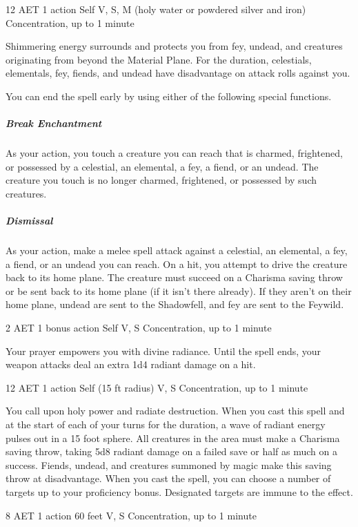 {12 AET}
{1 action}
{Self}
{V, S, M (holy water or powdered silver and iron)}
{Concentration, up to 1 minute}

Shimmering energy surrounds and protects you from fey, undead, and creatures originating from beyond the Material Plane. For the duration, celestials, elementals, fey, fiends, and undead have disadvantage on attack rolls against you.

You can end the spell early by using either of the following special functions.

\subparagraph*{Break Enchantment} As your action, you touch a creature you can reach that is charmed, frightened, or possessed by a celestial, an elemental, a fey, a fiend, or an undead. The creature you touch is no longer charmed, frightened, or possessed by such creatures.

\subparagraph*{Dismissal} As your action, make a melee spell attack against a celestial, an elemental, a fey, a fiend, or an undead you can reach. On a hit, you attempt to drive the creature back to its home plane. The creature must succeed on a Charisma saving throw or be sent back to its home plane (if it isn't there already). If they aren't on their home plane, undead are sent to the Shadowfell, and fey are sent to the Feywild.


{2 AET}
{1 bonus action}
{Self}
{V, S}
{Concentration, up to 1 minute}

Your prayer empowers you with divine radiance. Until the spell ends, your weapon attacks deal an extra 1d4 radiant damage on a hit.

{12 AET}
{1 action}
{Self (15 ft radius)}
{V, S}
{Concentration, up to 1 minute}

You call upon holy power and radiate destruction. When you cast this spell and at the start of each of your turns for the duration, a wave of radiant energy pulses out in a 15 foot sphere. All creatures in the area must make a Charisma saving throw, taking 5d8 radiant damage on a failed save or half as much on a success. Fiends, undead, and creatures summoned by magic make this saving throw at disadvantage. When you cast the spell, you can choose a number of targets up to your proficiency bonus. Designated targets are immune to the effect.

{8 AET}
{1 action}
{60 feet}
{V, S}
{Concentration, up to 1 minute}

